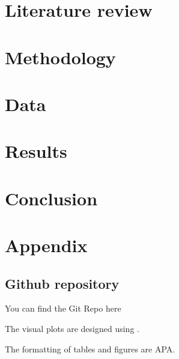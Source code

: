\documentclass[a4paper,11pt]{article}
\begin{document}
\section{Literature review} \label{sec:litrev}
	
\section{Methodology} \label{sec:method}
    
\section{Data} \label{sec:data}
    
\section{Results} \label{sec:results}
	
\section{Conclusion} \label{sec:conclusion}
	

\newpage
 
 

\newpage
\appendix
\section{Appendix} \label{sec:appendix}


\subsection{Github repository}
You can find the Git Repo here

The visual plots are designed using .

The formatting of tables and figures are APA.
\end{document}
